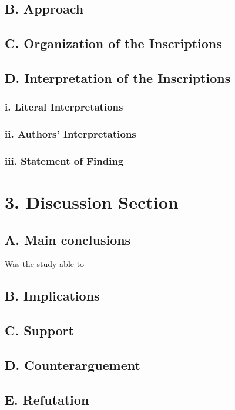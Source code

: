 \documentclass[]{tufte-handout}
\begin{document}
\subsection{B. Approach}\label{b.-approach}

\subsection{C. Organization of the
Inscriptions}\label{c.-organization-of-the-inscriptions}

\subsection{D. Interpretation of the
Inscriptions}\label{d.-interpretation-of-the-inscriptions}

\subsubsection{i. Literal
Interpretations}\label{i.-literal-interpretations}

\subsubsection{ii. Authors'
Interpretations}\label{ii.-authors-interpretations}

\subsubsection{iii. Statement of
Finding}\label{iii.-statement-of-finding}

\section{3. Discussion Section}\label{discussion-section}

\subsection{A. Main conclusions}\label{a.-main-conclusions}

Was the study able to

\subsection{B. Implications}\label{b.-implications}

\subsection{C. Support}\label{c.-support}

\subsection{D. Counterarguement}\label{d.-counterarguement}

\subsection{E. Refutation}\label{e.-refutation}


\end{document}
